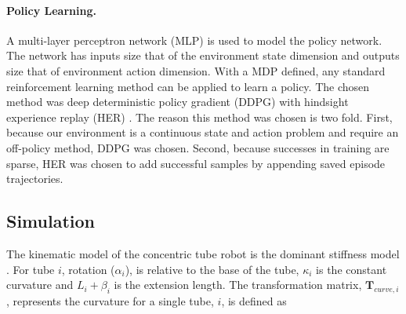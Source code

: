 \paragraph{Policy Learning.} A multi-layer perceptron network (MLP) is used to model the policy network. The network has inputs size that of the environment state dimension and outputs size that of environment action dimension. With a MDP defined, any standard reinforcement learning method can be applied to learn a policy. The chosen method was deep deterministic policy gradient (DDPG) \cite{Lillicrap2015} with hindsight experience replay (HER) \cite{andrychowicz2017hindsight}. The reason this method was chosen is two fold. First, because our environment is a continuous state and action problem and require an off-policy method, DDPG was chosen. Second, because successes in training are sparse, HER was chosen to add successful samples by appending saved episode trajectories.

\subsection{Simulation}
The kinematic model of the concentric tube robot is the dominant stiffness model \cite{Dupont2010}. For tube $i$, rotation ($\alpha_i$), is relative to the base of the tube, $\kappa_i$ is the constant curvature and $L_i + \beta_i$ is the extension length. The transformation matrix, $\textbf{T}_{curve,i}$, represents the curvature for a single tube, $i$, is defined as

